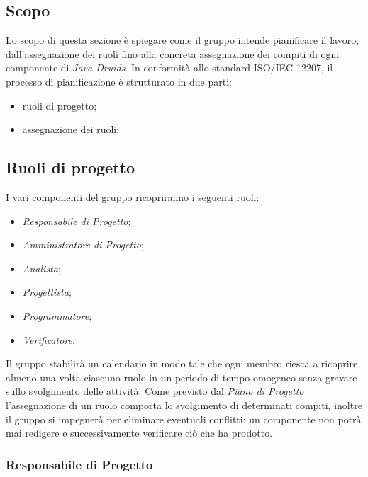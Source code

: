 \subsection{Scopo}\label{4.2.1}

Lo scopo di questa sezione è spiegare come il gruppo intende pianificare il lavoro, dall'assegnazione dei ruoli fino alla concreta assegnazione dei compiti di ogni componente di \textit{Java Druids}. In conformità allo standard ISO/IEC 12207, il processo di pianificazione è strutturato in due parti:
\begin{itemize}
	\item ruoli di progetto;
	\item assegnazione dei ruoli;
\end{itemize}

\subsection{Ruoli di progetto}\label{4.2.2}

I vari componenti del gruppo ricopriranno i seguenti ruoli:
\begin{itemize}
	\item \textit{Responsabile di Progetto};
	\item \textit{Amministratore di Progetto};
	\item \textit{Analista};
	\item \textit{Progettista};
	\item \textit{Programmatore};
	\item \textit{Verificatore}.
\end{itemize}

Il gruppo stabilirà un calendario in modo tale che ogni membro riesca a ricoprire almeno una volta ciascuno ruolo in un periodo di tempo omogeneo senza gravare sullo svolgimento delle attività. Come previsto dal \textit{Piano di Progetto} l'assegnazione di un ruolo comporta lo svolgimento di determinati compiti, inoltre il gruppo si impegnerà per eliminare eventuali conflitti: un componente non potrà mai redigere e successivamente verificare ciò che ha prodotto.

\subsubsection{Responsabile di Progetto}\label{4.2.2.1}

